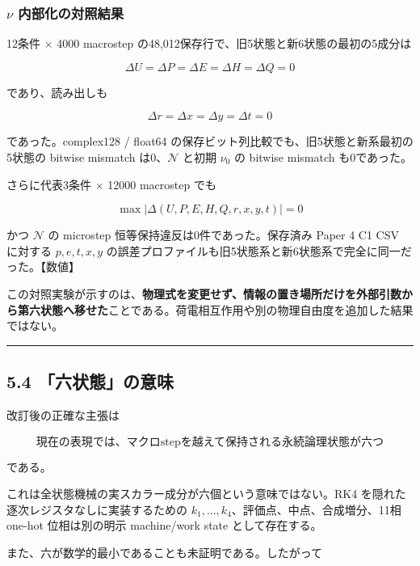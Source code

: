 \documentclass[
  a4paper,
]{ltjsarticle}
\begin{document}
\subsubsection{\texorpdfstring{\(\nu\)
内部化の対照結果}{\textbackslash nu 内部化の対照結果}}\label{nu-ux5185ux90e8ux5316ux306eux5bfeux7167ux7d50ux679c}

12条件 \(\times\) 4000 macrostep
の48,012保存行で、旧5状態と新6状態の最初の5成分は

\[
\boxed{\Delta U=\Delta P=\Delta E=\Delta H=\Delta Q=0}
\]

であり、読み出しも

\[
\boxed{\Delta r=\Delta x=\Delta y=\Delta t=0}
\]

であった。complex128 / float64
の保存ビット列比較でも、旧5状態と新系最初の5状態の bitwise mismatch
は0、\(\mathcal N\) と初期 \(\nu_0\) の bitwise mismatch も0であった。

さらに代表3条件 \(\times\) 12000 macrostep でも

\[
\boxed{
\max|\Delta(U,P,E,H,Q,r,x,y,t)|=0
}
\]

かつ \(\mathcal N\) の microstep 恒等保持違反は0件であった。保存済み
Paper 4 C1 CSV に対する \(p,e,t,x,y\)
の誤差プロファイルも旧5状態系と新6状態系で完全に同一だった。【数値】

この対照実験が示すのは、\textbf{物理式を変更せず、情報の置き場所だけを外部引数から第六状態へ移せた}ことである。荷電相互作用や別の物理自由度を追加した結果ではない。

\begin{center}\rule{0.5\linewidth}{0.5pt}\end{center}

\subsection{5.4
「六状態」の意味}\label{ux516dux72b6ux614bux306eux610fux5473}

改訂後の正確な主張は

\[
\boxed{
\text{現在の表現では、マクロstepを越えて保持される永続論理状態が六つ}
}
\]

である。

これは全状態機械の実スカラー成分が六個という意味ではない。RK4
を隠れた逐次レジスタなしに実装するための
\(k_1,\ldots,k_4\)、評価点、中点、合成増分、11相 one-hot 位相は別の明示
machine/work state として存在する。

また、六が数学的最小であることも未証明である。したがって

\begin{center}
\end{center}
\end{document}
